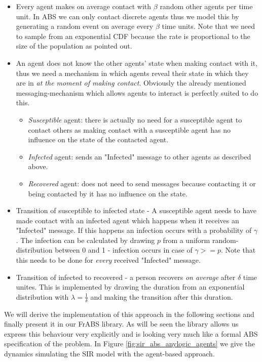 \begin{itemize}
	\item Every agent makes on average contact with $\beta$ random other agents per time unit. In ABS we can only contact discrete agents thus we model this by generating a random event on average every $\beta$ time units. Note that we need to sample from an exponential CDF because the rate is proportional to the size of the population as \cite{borshchev_system_2004} pointed out.
	
	\item An agent does not know the other agents' state when making contact with it, thus we need a mechanism in which agents reveal their state in which they are in \textit{at the moment of making contact}. Obviously the already mentioned messaging-mechanism which allows agents to interact is perfectly suited to do this.
	\begin{itemize}
		\item \textit{Susceptible} agent: there is actually no need for a susceptible agent to contact others as making contact with a susceptible agent has no influence on the state of the contacted agent.
		\item \textit{Infected} agent: sends an "Infected" message to other agents as described above.
		\item \textit{Recovered} agent: does not need to send messages because contacting it or being contacted by it has no influence on the state.
	\end{itemize}
	
	\item Transition of susceptible to infected state - A susceptible agent needs to have made contact with an infected agent which happens when it receives an "Infected" message. If this happens an infection occurs with a probability of $\gamma$. The infection can be calculated by drawing $p$ from a uniform random-distribution between 0 and 1 - infection occurs in case of $\gamma >= p $. Note that this needs to be done for \textit{every} received "Infected" message.
	
	\item Transition of infected to recovered - a person recovers \textit{on average} after $\delta$ time unites. This is implemented by drawing the duration from an exponential distribution \cite{borshchev_system_2004} with $\lambda = \frac{1}{\delta}$ and making the transition after this duration.
\end{itemize}

We will derive the implementation of this approach in the following sections and finally present it in our FrABS library. As will be seen the library allows us express this behaviour very explicitly and is looking very much like a formal ABS specification of the problem. In Figure \ref{fig:sir_abs_anylogic_agents} we give the dynamics simulating the SIR model with the agent-based approach.

